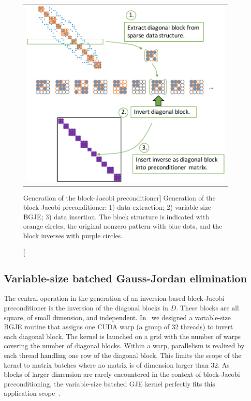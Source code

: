 \begin{figure}[t]
\begin{center}
\begin{tabular}{c}
\includegraphics[width=.65\columnwidth]{plots/scheme_inversion}
\end{tabular}
\end{center}
\caption
[Generation of the block-Jacobi preconditioner]
{Generation of the block-Jacobi preconditioner: 1) data extraction; 2) variable-size BGJE; 3) data insertion.
The block structure is indicated with orange circles, the original nonzero pattern with blue dots, 
    {and} the block inverses with purple circles.
}
\label{2017-gje-block-jacobi:fig:batchedgje}
\end{figure}

\subsection{Variable-size batched Gauss-Jordan elimination}
\label{2017-gje-block-jacobi:subsec:s3-inversion}

The central operation in the generation of an 
inversion-based block-Jacobi preconditioner
is the inversion of the diagonal blocks in $D$.
These blocks are all square, of small dimension, and independent.
In~\cite{Anzt:2017:BGE:3026937.3026940}
we designed a variable-size BGJE routine
that assigns one CUDA warp (a group of 32 threads) 
to invert each diagonal block.
The kernel is launched on a grid with the number of warps 
covering the number of diagonal blocks.
Within a warp, parallelism is realized by each thread handling one row
of the diagonal block.
This limits the scope of the kernel to matrix batches where no matrix
is of dimension larger than 32.
As blocks of larger dimension are rarely {encountered} in the context
of block-Jacobi preconditioning, the variable-size batched GJE
kernel perfectly fits this application scope~\cite{Anzt:2017:BGE:3026937.3026940}.

